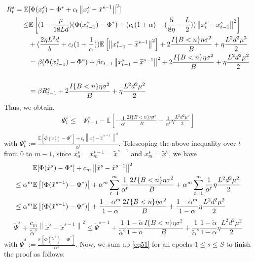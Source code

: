 \documentclass{article}
\newcommand*{\E}{\mathbb{E}}
\newcommand{\norm}[1]{\left\lVert#1\right\rVert}
\theoremstyle{definition}
\theoremstyle{remark}
\begin{document}
{{ }
 \begin{equation}
  \begin{split} 
R_t^s = \E&[\Phi({x}_{t}^s)-\Phi^* + c_t \norm{x_{t}^s - \tilde{x}^{s-1}}^2] \notag\\
\leq & \E\left[(1- \frac{\mu}{18 Ld})(\Phi({x}_{t-1}^s)-\Phi^*)  + (c_t (1+{\alpha})-(\frac{5}{8\eta} - \frac{L}{2}))\norm{{x}_t^s-x_{t-1}^s}^2 \right] \\
 & + (\frac{2\eta L^2 d}{b}+c_t (1+\frac{1}{\alpha}))\E\left[\norm{x_{t-1}^s-\widetilde{x}^{s-1}}^2\right]+ 2\frac{I\{B < n\}\eta \sigma ^2}{B}+\eta \frac{L^2 d^2 \mu^2}{2}\\
 & = \beta(\Phi({x}_{t-1}^s)-\Phi^*)+\beta c_{t-1}\norm{x_{t-1}^s-\widetilde{x}^{s-1}}^2+ 2\frac{I\{B < n\}\eta \sigma ^2}{B}+\eta \frac{L^2 d^2 \mu^2}{2}\\
 \\
 & = \beta R_{t-1}^s+ 2\frac{I\{B < n\}\eta \sigma ^2}{B}+\eta \frac{L^2 d^2 \mu^2}{2}
 \end{split}
 \end{equation}
 Thus, we obtain,
 \begin{equation}\label{eq47}
\begin{split}
\Psi_t^s\leq& \Psi_{t-1}^s - \E\left[- \frac{1}{\alpha^t}\frac{2I\{B < n\}\eta \sigma ^2}{B}- \frac{1}{\alpha^t}\eta \frac{L^2 d^2 \mu^2}{2}\right]\\
\end{split}
\end{equation}
with $\Psi_t^s := \frac{\E[\Phi({x}_{t}^s)-\Phi^*]+ c_t \norm{x_{t}^s - \tilde{x}^{s-1}}^2}{{\alpha}^t}$. Telescoping the above inequality over $t$ from $0$ to $m-1$, since $x_0^s = x_m^{s-1} = \tilde{x}^{s-1}$ and $x_m^s = \tilde{x}^s$, we have 
\begin{align}
\E&[\Phi(\tilde{x}^s)-\Phi^*]+ c_m \norm{\tilde{x}^{s} - \tilde{x}^{s-1}}^2\notag\\
\leq\alpha^m\E&\left[(\Phi(\tilde{x}^{s-1}) - \Phi^*)\right] +\alpha^m\sum_{t=1}^m \frac{1}{\alpha^t}\frac{2I\{B < n\}\eta \sigma ^2}{B}+\alpha^m\sum_{t=1}^m \frac{1}{\alpha^t}\eta \frac{L^2 d^2 \mu^2}{2}\notag
\\\leq\alpha^m\E&\left[(\Phi(\tilde{x}^{s-1}) - \Phi^*)\right] + \frac{1-\alpha^m}{1-\alpha}\frac{2I\{B < n\}\eta \sigma ^2}{B}+\frac{1-\alpha^m}{1-\alpha}\eta \frac{L^2 d^2 \mu^2}{2}\label{eq50}
\end{align}
 {\color{blue}
\begin{equation}\label{eq51}
\widetilde{\Psi}^s + \frac{c_m}{\tilde{\alpha}^s} \norm{\tilde{x}^{s} - \tilde{x}^{s-1}}^2\leq \widetilde{\Psi}^{s-1} + \frac{1}{\tilde{\alpha}^s} \frac{1-\tilde{\alpha}}{1-{\alpha}}\frac{I\{B < n\}\eta \sigma ^2}{B}+ \frac{1}{\tilde{\alpha}^s} \frac{1-\tilde{\alpha}}{1-{\alpha}}\eta \frac{L^2 d^2 \mu^2}{2}
\end{equation}
}
with $\widetilde{\Psi}^s := \frac{\E[\Phi(\tilde{x}^s)-\Phi^*]}{{\alpha}^s}$. Now, we sum up \eqref{eq51} for all epochs $1 \leq s \leq S$ to finish the proof as follows:

}
\end{document}
